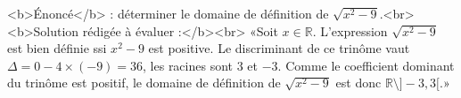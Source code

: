 <b>Énoncé</b> : déterminer le domaine de définition de $\sqrt{x^2-9}$.<br> <b>Solution rédigée à évaluer :</b><br>  «Soit $x\in\mathbb{R}$.  L'expression $\sqrt{x^2-9}$ est bien définie ssi $x^2-9$ est positive. Le discriminant de ce trinôme vaut $\Delta = 0-4\times(-9)=36$, les racines sont $3$ et $-3$. Comme le coefficient dominant du trinôme est positif, le domaine de définition de $\sqrt{x^2-9}$ est donc $\mathbb{R}\setminus ]-3,3[$.»

\begin{reponses}
\end{reponses}

\begin{comment}
Réponse correcte mais on ne doit surtout pas utiliser un discriminant pour cela : l'expression $x^2-9$ doit être reconnue, c'est l'identité remarquable pour $a^2-b^2$.
\end{comment}

